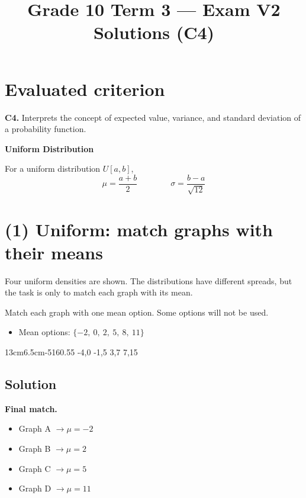 \makeatletter
{}
\makeatother





\title{Grade 10 Term 3 --- Exam V2 Solutions (C4)}
\author{}
\date{}


\maketitle
\tableofcontents

\section*{Evaluated criterion}
\textbf{C4.} Interprets the concept of expected value, variance, and standard deviation of a probability function.

\textbf{Uniform Distribution}

For a uniform distribution $U[a,b]$,
\[
\mu=\frac{a+b}{2}
\qquad \qquad
\sigma=\frac{b-a}{\sqrt{12}}
\]

\section{(1) Uniform: match graphs with their means}
Four uniform densities are shown. The distributions have different spreads, but the task is only to match each graph with its mean.

Match each graph with one mean option. Some options will not be used.
\begin{itemize}
\item Mean options: $\{-2,\ 0,\ 2,\ 5,\ 8,\ 11\}$
\end{itemize}
\UniformFourGraph
{13cm}{6.5cm}{-5}{16}{0.55}
{-4,0}
{-1,5}
{3,7}
{7,15}

\subsection*{Solution}
\textbf{Final match.}
\begin{itemize}
\item Graph A $\to \mu=-2$
\item Graph B $\to \mu=2$
\item Graph C $\to \mu=5$
\item Graph D $\to \mu=11$
\end{itemize}

